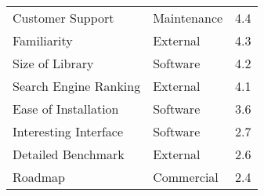 \begin{table}[htbp]
\begin{tabular}{llr}
    Customer Support & Maintenance &                 4.4  \\
    Familiarity & External &                 4.3  \\
    Size of Library & Software &                 4.2  \\
    Search Engine Ranking & External &                 4.1  \\
    Ease of Installation & Software &                 3.6  \\
    Interesting Interface & Software &                 2.7  \\
    Detailed Benchmark & External &                 2.6  \\
    Roadmap & Commercial &                 2.4  \\
    \bottomrule
    \end{tabular}%
  \label{tab:factor-priority}%
\end{table}%
